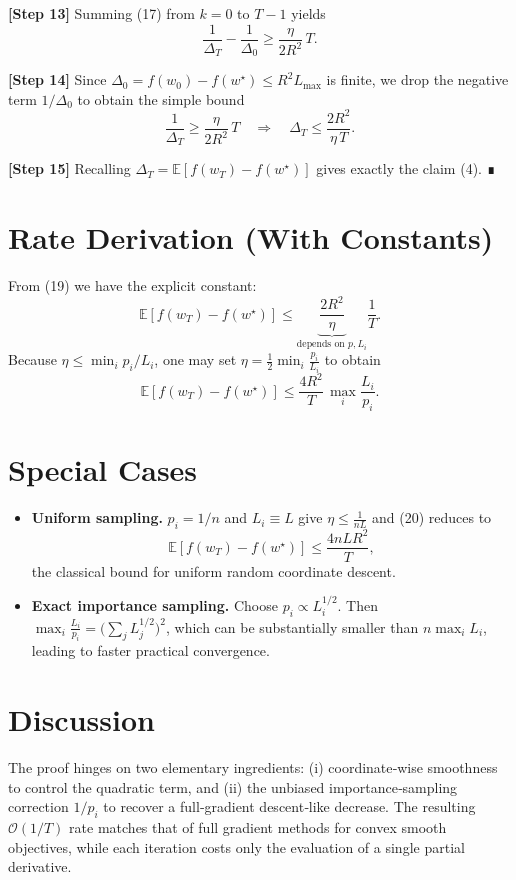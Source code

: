\documentclass{article}
\newcommand{\E}{\mathbb{E}}
\begin{document}
\textbf{[Step 13]} Summing (17) from $k=0$ to $T-1$ yields
\[
\frac{1}{\Delta_{T}}-\frac{1}{\Delta_{0}}
\ge \frac{\eta}{2R^{2}}\,T.
\tag{18}
\]

\textbf{[Step 14]} Since $\Delta_{0}=f(w_{0})-f(w^{\star})\le R^{2}L_{\max}$ is finite, we drop the negative term $1/\Delta_{0}$ to obtain the simple bound
\[
\frac{1}{\Delta_{T}}\ge \frac{\eta}{2R^{2}}\,T
\quad\Longrightarrow\quad
\Delta_{T}\le \frac{2R^{2}}{\eta\,T}.
\tag{19}
\]

\textbf{[Step 15]} Recalling $\Delta_T=\E[f(w_T)-f(w^{\star})]$ gives exactly the claim (4). ∎

\section*{Rate Derivation (With Constants)}
From (19) we have the explicit constant:
\[
\E\!\left[f(w_{T})-f(w^{\star})\right]\le
\underbrace{\frac{2R^{2}}{\eta}}_{\text{depends on }p,L_i}
\frac{1}{T}.
\]
Because $\eta\le\min_i p_i/L_i$, one may set $\eta =\frac{1}{2}\min_i \frac{p_i}{L_i}$ to obtain
\[
\E\!\left[f(w_{T})-f(w^{\star})\right]\le
\frac{4R^{2}}{T}\,\max_i\frac{L_i}{p_i}.
\tag{20}
\]

\section*{Special Cases}
\begin{itemize}
\item \textbf{Uniform sampling.} $p_i=1/n$ and $L_i\equiv L$ give $\eta\le \frac{1}{nL}$ and (20) reduces to
\[
\E[f(w_T)-f(w^{\star})]\le \frac{4nL R^{2}}{T},
\]
the classical bound for uniform random coordinate descent.
\item \textbf{Exact importance sampling.} Choose $p_i\propto L_i^{1/2}$. Then $\max_i \frac{L_i}{p_i}= \bigl(\sum_j L_j^{1/2}\bigr)^{2}$, which can be substantially smaller than $n\max_i L_i$, leading to faster practical convergence.
\end{itemize}

\section*{Discussion}
The proof hinges on two elementary ingredients: (i) coordinate‑wise smoothness to control the quadratic term, and (ii) the unbiased importance‑sampling correction $1/p_i$ to recover a full‑gradient descent‑like decrease. The resulting $\mathcal{O}(1/T)$ rate matches that of full gradient methods for convex smooth objectives, while each iteration costs only the evaluation of a single partial derivative.
\end{document}
